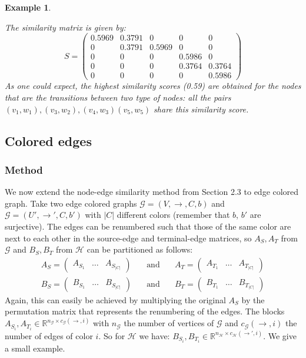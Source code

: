 \documentclass[a4paper,11pt]{report}
\newtheorem{example}[theorem]{Example}
\newcommand{\R}{{\mathbb R}}
\newcommand{\graf}{\mathscr{G}}
\newcommand{\grafeen}{\mathscr{H}}
\newcommand{\hgraf}{\mathcal{G}}
\begin{document}
\begin{example}
\begin{center}
\begin{tikzpicture}[->,>=stealth',shorten >=1pt,auto,node distance=3cm,
                    thick]
\end{tikzpicture}
\end{center}
The similarity matrix is given by:
$$S = \begin{pmatrix}
0.5969&0.3791&0&0&0\\
0&0.3791&0.5969&0&0\\
0&0&0&0.5986&0\\
0&0&0&0.3764&0.3764\\
0&0&0&0&0.5986
\end{pmatrix}$$
As one could expect, the highest similarity scores (0.59) are obtained for the nodes that are the transitions between two type of 
nodes: all the pairs $(v_1, w_1), (v_3, w_2), (v_4, w_3) (v_5, w_5)$ share this similarity 
score.
\end{example}

\subsection{Colored edges}
\subsubsection{Method}
We now extend the node-edge similarity method from Section 2.3 to edge colored 
graph. Take two edge colored graphs $\graf = (V, \to, C, b)$ and $\hgraf = (U', \to', C, b')$ 
with $|C|$ different colors (remember that $b$, $b'$ are surjective). The edges 
can be renumbered such that those of the same color are next to each other in the 
source-edge and terminal-edge matrices, so $A_S, A_T$ from 
$\graf$ and $B_S, B_T$ from $\grafeen$ can be partitioned as follows:
\begin{eqnarray*}
  A_S = \begin{pmatrix}
  A_{S_1} & \ldots & A_{S_{|C|}}
  \end{pmatrix} \quad &\text{and}& \quad A_T = \begin{pmatrix}
  A_{T_1} & \ldots & A_{T_{|C|}}
  \end{pmatrix}\\
   B_S = \begin{pmatrix}
  B_{S_1} & \ldots & B_{S_{|C|}}
  \end{pmatrix} \quad &\text{and}& \quad B_T = \begin{pmatrix}
  B_{T_1} & \ldots & B_{T_{|C|}}
  \end{pmatrix}
\end{eqnarray*}
Again, this can easily be achieved by multiplying the original $A_S$ by the permutation matrix
that represents the renumbering of the edges. The blocks $A_{S_i}, A_{T_i} \in \R^{n_\graf \times c_\graf(\to, i)}$ with $n_\graf$ 
the number of vertices of $\graf$ and $c_\graf(\to,i)$ the number of edges of 
color $i$. So for $\grafeen$ we have: $B_{S_i}, B_{T_i} \in \R^{n_\grafeen \times c_\grafeen(\to', 
i)}$. We give a small example.
\end{document}
